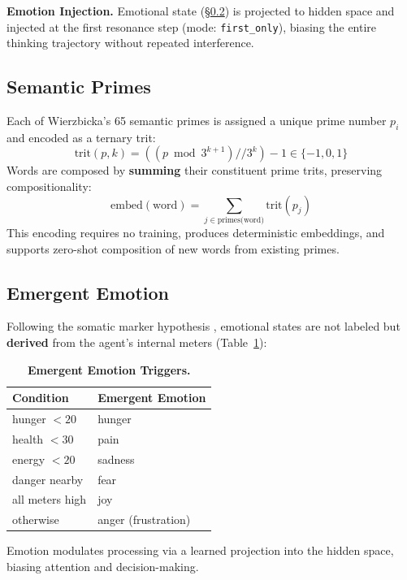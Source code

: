\documentclass{article}
\begin{document}
\textbf{Emotion Injection.} Emotional state (\S\ref{sec:emotion}) is projected to hidden space and injected at the first resonance step (mode: \texttt{first\_only}), biasing the entire thinking trajectory without repeated interference.

\subsection{Semantic Primes}
\label{sec:primes}
Each of Wierzbicka's 65 semantic primes is assigned a unique prime number $p_i$ and encoded as a ternary trit:
\begin{equation}
\text{trit}(p, k) = ((p \bmod 3^{k+1}) \mathbin{/\!/} 3^k) - 1 \in \{-1, 0, 1\}
\end{equation}
Words are composed by \textbf{summing} their constituent prime trits, preserving compositionality:
\begin{equation}
\text{embed}(\text{word}) = \sum_{j \in \text{primes(word)}} \text{trit}(p_j)
\end{equation}
This encoding requires no training, produces deterministic embeddings, and supports zero-shot composition of new words from existing primes.

\subsection{Emergent Emotion}
\label{sec:emotion}
Following the somatic marker hypothesis \cite{damasio1994descartes}, emotional states are not labeled but \textbf{derived} from the agent's internal meters (Table~\ref{tab:emotions}):

\begin{table}[h]
\centering
\caption{\textbf{Emergent Emotion Triggers.}}
\label{tab:emotions}
\begin{tabular}{ll}
\toprule
\textbf{Condition} & \textbf{Emergent Emotion} \\
\midrule
hunger $< 20$ & hunger \\
health $< 30$ & pain \\
energy $< 20$ & sadness \\
danger nearby & fear \\
all meters high & joy \\
otherwise & anger (frustration) \\
\bottomrule
\end{tabular}
\end{table}

Emotion modulates processing via a learned projection into the hidden space, biasing attention and decision-making.
\end{document}
